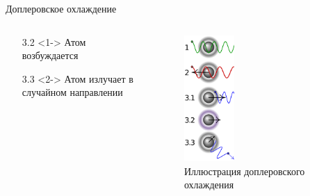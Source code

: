 \documentclass{beamer}
\begin{document}
    \begin{frame}{Доплеровское охлаждение}
        \begin{columns}

        \begin{column}{0.5\textwidth}

            \begin{itemize}
                \item[3.2] <1-> Атом возбуждается
                \item[3.3] <2-> Атом излучает в случайном направлении
            \end{itemize}

        \end{column}

        \begin{column}{0.5\textwidth}
            \begin{figure}
                \centering
                \includegraphics[width=0.35\textwidth]{media/dopler-cooling.png}
                \caption{Иллюстрация доплеровского охлаждения}
            \end{figure}
        \end{column}

        \end{columns}

    \end{frame}
\end{document}

